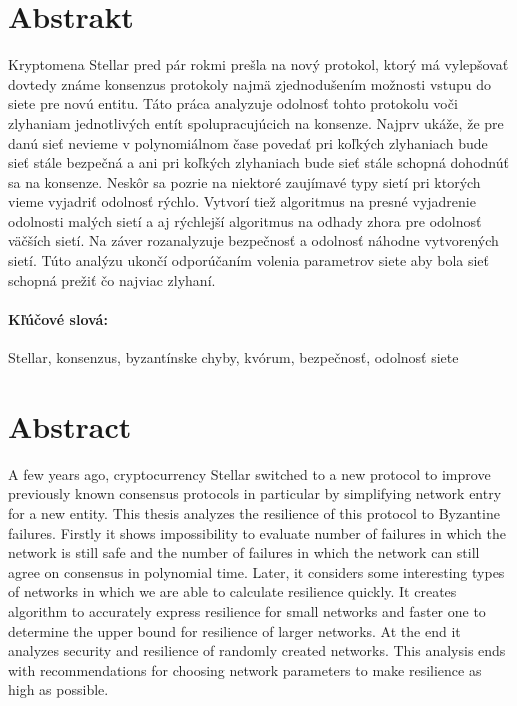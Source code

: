 \documentclass[12pt, twoside]{book}
\begin{document}

\newpage 
\section*{Abstrakt}

Kryptomena Stellar pred pár rokmi prešla na nový protokol, ktorý má vylepšovať
dovtedy známe konsenzus protokoly najmä zjednodušením možnosti vstupu do siete
pre novú entitu.
Táto práca analyzuje odolnosť tohto protokolu voči zlyhaniam jednotlivých
entít spolupracujúcich na konsenze. Najprv ukáže, že pre danú sieť nevieme
v polynomiálnom čase povedať pri koľkých zlyhaniach bude sieť stále bezpečná
a ani pri koľkých zlyhaniach bude sieť stále schopná dohodnúť sa na konsenze.
Neskôr sa pozrie na niektoré zaujímavé typy sietí pri ktorých vieme vyjadriť
odolnosť rýchlo.
Vytvorí tiež algoritmus na presné vyjadrenie odolnosti malých sietí a aj rýchlejší
algoritmus na odhady zhora pre odolnosť väčších sietí.
Na záver rozanalyzuje bezpečnosť a odolnosť náhodne vytvorených sietí.
Túto analýzu ukončí odporúčaním volenia parametrov siete aby bola sieť schopná
prežiť čo najviac zlyhaní.

\paragraph*{Kľúčové slová:} Stellar, konsenzus, byzantínske chyby,
kvórum, bezpečnosť, odolnosť siete


\newpage 
\section*{Abstract}

A few years ago, cryptocurrency Stellar switched to a new protocol
to improve previously known consensus protocols in particular by simplifying
network entry for a new entity.
This thesis analyzes the resilience of this protocol to Byzantine failures.
Firstly it shows impossibility to evaluate number of failures in which the
network is still safe and the number of failures in which the network can still
agree on consensus in polynomial time.
Later, it considers some interesting types of networks in which we are able
to calculate resilience quickly.
It creates algorithm to accurately express resilience for small networks and
faster one to determine the upper bound for resilience of larger networks.
At the end it analyzes security and resilience of randomly created networks.
This analysis ends with recommendations for choosing network parameters to
make resilience as high as possible.
\end{document}
